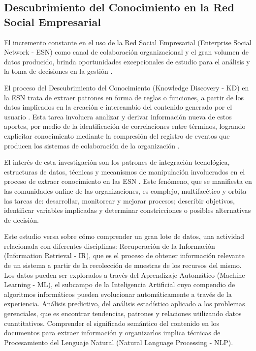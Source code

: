 \documentclass[a4paper,fleqn,spanish]{cas-dc}
\begin{document}
\subsection{Descubrimiento del Conocimiento en la Red Social Empresarial}\label{titulo-TESIS}


El incremento constante en el uso de la Red Social Empresarial (Enterprise
Social Network - ESN) \cite{Wehner_2017} como canal de colaboración
organizacional y el gran volumen de datos producido, brinda oportunidades
excepcionales de estudio para el análisis y la toma de decisiones en la gestión
\cite{Schwade2018}.

El proceso del Descubrimiento del Conocimiento (Knowledge Discovery - KD) en la
ESN trata de extraer patrones en forma de reglas o funciones, a partir de los
datos implicados en la creación e intercambio del contenido generado por el
usuario \cite{Tao2020}. Esta tarea involucra analizar y derivar información
nueva de estos aportes, por medio de la identificación de correlaciones entre
términos, logrando explicitar conocimiento mediante la compresión del registro
de eventos que producen los sistemas de colaboración de la organización
\cite{OLeary2017}.

El interés de esta investigación son los patrones de integración tecnológica,
estructuras de datos, técnicas y mecanismos de manipulación involucrados en el
proceso de extraer conocimiento en las ESN \cite{Hacker2017,Schwade2018}. Este
fenómeno, que se manifiesta en las comunidades online de las organizaciones, es
complejo, multifacético y orbita las tareas de: desarrollar, monitorear y
mejorar procesos; describir objetivos, identificar variables implicadas y
determinar constricciones o posibles alternativas de decisión.

Este estudio versa sobre cómo comprender un gran lote de datos, una actividad
relacionada con diferentes disciplinas: Recuperación de la Información
(Information Retrieval - IR), que es el proceso de obtener información
relevante de un sistema a partir de la recolección de muestras de los recursos
del mismo. Los datos pueden ser explorados a través del Aprendizaje Automático
(Machine Learning - ML), el subcampo de la Inteligencia Artificial cuyo
compendio de algoritmos informáticos pueden evolucionar automáticamente a
través de la experiencia. Análisis predictivo, del análisis estadístico
aplicado a los problemas gerenciales, que es encontrar tendencias, patrones y
relaciones utilizando datos cuantitativos. Comprender el significado semántico
del contenido en los documentos para extraer información y organizarlos implica
técnicas de Procesamiento del Lenguaje Natural (Natural Language Processing -
NLP).
\end{document}
